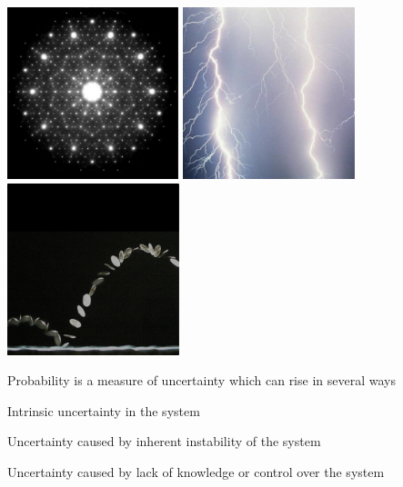 \documentclass[landscape,footrule]{foils}
\begin{document}
\titlefoil


\begin{center}
\includegraphics[height = 5cm]{electron-difraction}\hspace*{0.5cm}
\includegraphics[height = 5cm]{lightning}\hspace*{0.5cm}
\includegraphics[height = 5cm]{coin-flip}
\end{center}
\vspace*{1cm}

Probability is a measure of uncertainty which can rise in several ways
\begin{triangles}
\item Intrinsic uncertainty in the system 
\item Uncertainty caused by inherent instability of the system
\item Uncertainty caused by lack of knowledge or control over the system
\end{triangles}
\end{document}
